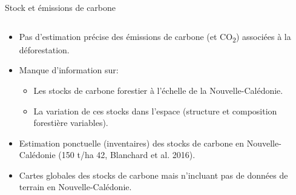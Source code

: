 \documentclass[10pt,table,dvipsnames,compress]{beamer}
\begin{document}
\begin{frame}[label={sec:org0a20960}]{Stock et émissions de carbone}
\begin{columns}
\begin{column}{0.6\columnwidth}
\begin{itemize}
\item Pas d'estimation précise des émissions de carbone (et CO\textsubscript{2}) associées à la déforestation.
\item Manque d'information sur:
\begin{itemize}
\item Les stocks de carbone forestier à l'échelle de la Nouvelle-Calédonie.
\item La variation de ces stocks dans l'espace (structure et composition forestière variables).
\end{itemize}
\item Estimation ponctuelle (inventaires) des stocks de carbone en Nouvelle-Calédonie (150 t/ha \textpm{}42, Blanchard et al. 2016).
\item Cartes globales des stocks de carbone mais n'incluant pas de données de terrain en Nouvelle-Calédonie.
\end{itemize}
\end{column}


\end{columns}
\end{frame}
\end{document}
